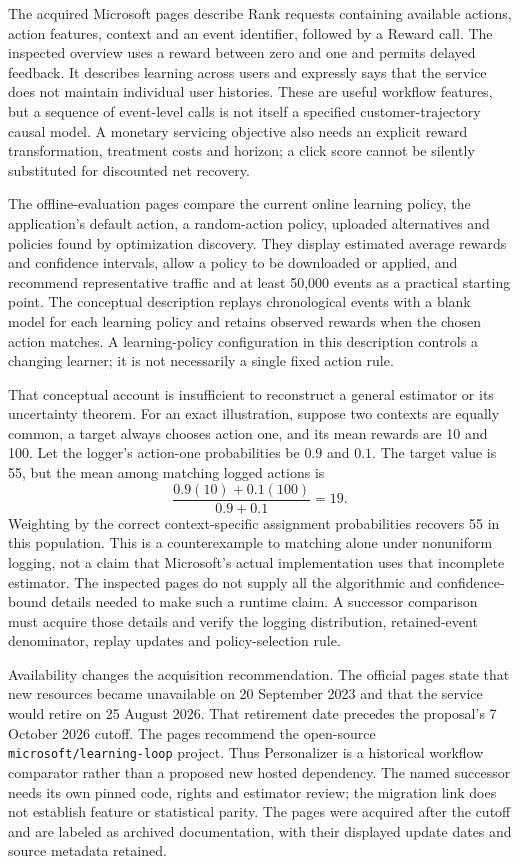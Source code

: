 The acquired Microsoft pages describe Rank requests containing available
actions, action features, context and an event identifier, followed by a Reward
call. The inspected overview uses a reward between zero and one and permits
delayed feedback. It describes learning across users and expressly says that
the service does not maintain individual user histories. These are useful
workflow features, but a sequence of event-level calls is not itself a
specified customer-trajectory causal model. A monetary servicing objective
also needs an explicit reward transformation, treatment costs and horizon;
a click score cannot be silently substituted for discounted net recovery.
\citep{exec16_cp_azure}

The offline-evaluation pages compare the current online learning policy,
the application's default action, a random-action policy, uploaded alternatives
and policies found by optimization discovery. They display estimated average
rewards and confidence intervals, allow a policy to be downloaded or applied,
and recommend representative traffic and at least 50,000 events as a practical
starting point. The conceptual description replays chronological events with
a blank model for each learning policy and retains observed rewards when the
chosen action matches. A learning-policy configuration in this description
controls a changing learner; it is not necessarily a single fixed action rule.
\citep{exec16_cp_azure}

That conceptual account is insufficient to reconstruct a general estimator
or its uncertainty theorem. For an exact illustration, suppose two contexts
are equally common, a target always chooses action one, and its mean rewards
are 10 and 100. Let the logger's action-one probabilities be $0.9$ and $0.1$.
The target value is 55, but the mean among matching logged actions is
\[
 \frac{0.9(10)+0.1(100)}{0.9+0.1}=19.
\]
Weighting by the correct context-specific assignment probabilities recovers
55 in this population. This is a counterexample to matching alone under
nonuniform logging, not a claim that Microsoft's actual implementation uses
that incomplete estimator. The inspected pages do not supply all the
algorithmic and confidence-bound details needed to make such a runtime
claim. A successor comparison must acquire those details and verify the
logging distribution, retained-event denominator, replay updates and
policy-selection rule. \citep{exec16_cp_azure,exec16_cp_exact}

Availability changes the acquisition recommendation. The official pages state
that new resources became unavailable on 20 September 2023 and that the service
would retire on 25 August 2026. That retirement date precedes the proposal's
7 October 2026 cutoff. The pages recommend the open-source
\texttt{microsoft/learning-loop} project. Thus Personalizer is a historical
workflow comparator rather than a proposed new hosted dependency. The named
successor needs its own pinned code, rights and estimator review; the migration
link does not establish feature or statistical parity. The pages were acquired
after the cutoff and are labeled as archived documentation, with their
displayed update dates and source metadata retained. \citep{exec16_cp_azure}

